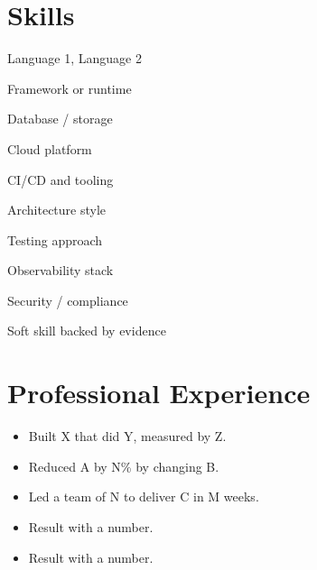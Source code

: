 \documentclass[paper=a4]{milanovic-resume}
\begin{document}
\makeheader


\section{Skills}
\begin{skills}
  \item Language 1, Language 2
  \item Framework or runtime
  \item Database / storage
  \item Cloud platform
  \item CI/CD and tooling
  \item Architecture style
  \item Testing approach
  \item Observability stack
  \item Security / compliance
  \item Soft skill backed by evidence
\end{skills}

\section{Professional Experience}

\begin{itemize}
  \item Built X that did Y, measured by Z.
  \item Reduced A by N\% by changing B.
  \item Led a team of N to deliver C in M weeks.
\end{itemize}

\begin{itemize}
  \item Result with a number.
  \item Result with a number.
\end{itemize}
\end{document}
